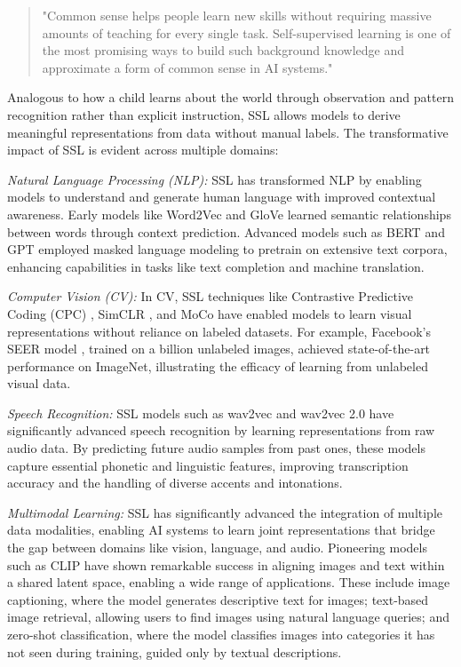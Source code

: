 \begin{quote}
    "Common sense helps people learn new skills without requiring massive amounts of teaching for every single task. Self-supervised learning is one of the most promising ways to build such background knowledge and approximate a form of common sense in AI systems."
\end{quote}

Analogous to how a child learns about the world through observation and pattern recognition rather than explicit instruction, SSL allows models to derive meaningful representations from data without manual labels. The transformative impact of SSL is evident across multiple domains:

\textit{Natural Language Processing (NLP):} SSL has transformed NLP by enabling models to understand and generate human language with improved contextual awareness. Early models like Word2Vec \citep{mikolov2013efficient} and GloVe \citep{pennington2014glove} learned semantic relationships between words through context prediction. Advanced models such as BERT \citep{devlin2019bert} and GPT \citep{radford2019language} employed masked language modeling to pretrain on extensive text corpora, enhancing capabilities in tasks like text completion and machine translation.

\textit{Computer Vision (CV):} In CV, SSL techniques like Contrastive Predictive Coding (CPC) \citep{oord2018representation}, SimCLR \citep{chen2020simple}, and MoCo \citep{he2020momentum} have enabled models to learn visual representations without reliance on labeled datasets. For example, Facebook's SEER model \citep{goyal2021self}, trained on a billion unlabeled images, achieved state-of-the-art performance on ImageNet, illustrating the efficacy of learning from unlabeled visual data.

\textit{Speech Recognition:} SSL models such as wav2vec \citep{schneider2019wav2vec} and wav2vec 2.0 \citep{baevski2020wav2vec} have significantly advanced speech recognition by learning representations from raw audio data. By predicting future audio samples from past ones, these models capture essential phonetic and linguistic features, improving transcription accuracy and the handling of diverse accents and intonations.

\textit{Multimodal Learning:} SSL has significantly advanced the integration of multiple data modalities, enabling AI systems to learn joint representations that bridge the gap between domains like vision, language, and audio. Pioneering models such as CLIP \citep{radford2021learning} have shown remarkable success in aligning images and text within a shared latent space, enabling a wide range of applications. These include image captioning, where the model generates descriptive text for images; text-based image retrieval, allowing users to find images using natural language queries; and zero-shot classification, where the model classifies images into categories it has not seen during training, guided only by textual descriptions.

